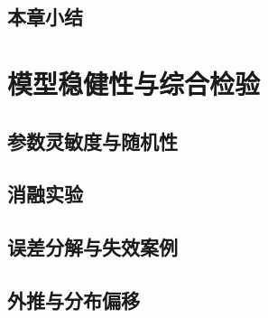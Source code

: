 \documentclass[bwprint]{gmcmthesis}
\numberwithin{equation}{section}
\numberwithin{figure}{section}
\numberwithin{table}{section}
\begin{document}
\subsection{本章小结}


\clearpage
\section{模型稳健性与综合检验}

%
%

\subsection{参数灵敏度与随机性}


\subsection{消融实验}


\subsection{误差分解与失效案例}


\subsection{外推与分布偏移}
\end{document}
